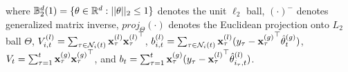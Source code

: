 where $\mathbb{B}_{2}^{d}(1)=\{\theta \in \mathbb{R}^{d}:||\theta||_{2} \leq 1\}$ denotes the unit $\ell_{2}$ ball, $(\cdot)^{-}$ denotes generalized matrix inverse, 
$\textit{proj}_{\Theta}(\cdot)$ denotes the Euclidean projection onto $L_{2}$ ball $\Theta$,
${V}^{(l)}_{i,t}=\sum_{\tau\in\mathcal{N}_{i}(t)}\mathbf{x}_{\tau}^{(l)}{\mathbf{x}_{\tau}^{(l)}}^{\top}$, ${b}^{(l)}_{i,t}=\sum_{\tau\in \mathcal{N}_{i}(t)}\mathbf{x}_{\tau}^{(l)}(y_{\tau}-{\mathbf{x}_{\tau}^{(g)}}^{\top}\hat{\theta}_{t}^{(g)})$,
${V}_{t}=\sum_{\tau=1}^{t}\mathbf{x}_{\tau}^{(g)}{\mathbf{x}_{\tau}^{(g)}}^{\top}$,
and 
${b}_{t}=\sum_{\tau=1}^{t}\mathbf{x}_{\tau}^{(g)}(y_{\tau}-{\mathbf{x}_{\tau}^{(l)}}^{\top}\hat{\theta}^{(l)}_{i_{\tau},t})$.

